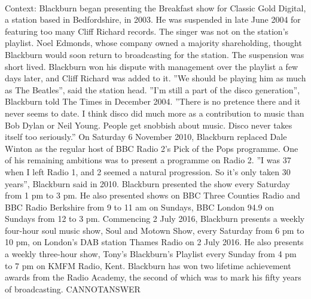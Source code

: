 \documentclass[11pt,a4paper, onecolumn]{article}
\begin{document}
\\ Context: Blackburn began presenting the Breakfast show for Classic Gold Digital, a station based in Bedfordshire, in 2003. He was suspended in late June 2004 for featuring too many Cliff Richard records. The singer was not on the station's playlist. Noel Edmonds, whose company owned a majority shareholding, thought Blackburn would soon return to broadcasting for the station. The suspension was short lived. Blackburn won his dispute with management over the playlist a few days later, and Cliff Richard was added to it. ''We should be playing him as much as The Beatles'', said the station head. ''I'm still a part of the disco generation'', Blackburn told The Times in December 2004. ''There is no pretence there and it never seems to date. I think disco did much more as a contribution to music than Bob Dylan or Neil Young. People get snobbish about music. Disco never takes itself too seriously.'' On Saturday 6 November 2010, Blackburn replaced Dale Winton as the regular host of BBC Radio 2's Pick of the Pops programme. One of his remaining ambitions was to present a programme on Radio 2. ''I was 37 when I left Radio 1, and 2 seemed a natural progression. So it's only taken 30 years'', Blackburn said in 2010. Blackburn presented the show every Saturday from 1 pm to 3 pm. He also presented shows on BBC Three Counties Radio and BBC Radio Berkshire from 9 to 11 am on Sundays, BBC London 94.9 on Sundays from 12 to 3 pm. Commencing 2 July 2016, Blackburn presents a weekly four-hour soul music show, Soul and Motown Show, every Saturday from 6 pm to 10 pm, on London's DAB station Thames Radio on 2 July 2016. He also presents a weekly three-hour show, Tony's Blackburn's Playlist every Sunday from 4 pm to 7 pm on KMFM Radio, Kent. Blackburn has won two lifetime achievement awards from the Radio Academy, the second of which was to mark his fifty years of broadcasting. CANNOTANSWER
\end{document}
